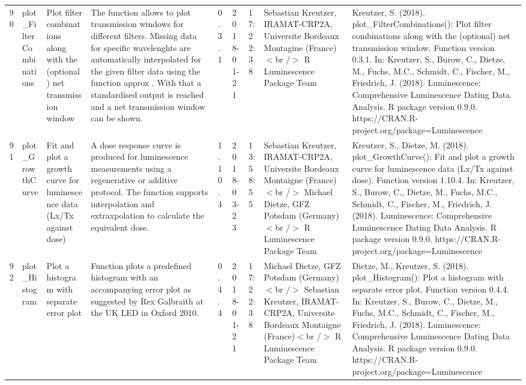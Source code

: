 \begin{table}[ht]
\begin{tabular}{rllllllll}
  90 & plot\_FilterCombinations & Plot filter combinations along with the (optional) net transmission window & The function allows to plot transmission windows for different filters. Missing data for specific wavelenghts are automatically interpolated for the given filter data using the function  approx . With that a standardised output is reached and a net transmission window can be shown. & 0.3.1 & 2018-01-21 & 17:22:38
 & Sebastian Kreutzer, IRAMAT-CRP2A, Universite Bordeaux Montagine (France)$<$br /$>$  R Luminescence Package Team & Kreutzer, S. (2018). plot\_FilterCombinations(): Plot filter combinations along with the (optional) net transmission window. Function version 0.3.1. In: Kreutzer, S., Burow, C., Dietze, M., Fuchs, M.C., Schmidt, C., Fischer, M., Friedrich, J. (2018). Luminescence: Comprehensive Luminescence Dating Data Analysis. R package version 0.9.0. https://CRAN.R-project.org/package=Luminescence
 \\ 
  91 & plot\_GrowthCurve & Fit and plot a growth curve for luminescence data (Lx/Tx against dose) & A dose response curve is produced for luminescence measurements using a regenerative or additive protocol. The function supports interpolation and extraxpolation to calculate the equivalent dose. & 1.10.4 & 2018-03-23 & 13:58:55
 & Sebastian Kreutzer, IRAMAT-CRP2A, Universite Bordeaux Montaigne (France) $<$br /$>$ Michael Dietze, GFZ Potsdam (Germany)$<$br /$>$  R Luminescence Package Team & Kreutzer, S., Dietze, M. (2018). plot\_GrowthCurve(): Fit and plot a growth curve for luminescence data (Lx/Tx against dose). Function version 1.10.4. In: Kreutzer, S., Burow, C., Dietze, M., Fuchs, M.C., Schmidt, C., Fischer, M., Friedrich, J. (2018). Luminescence: Comprehensive Luminescence Dating Data Analysis. R package version 0.9.0. https://CRAN.R-project.org/package=Luminescence
 \\ 
  92 & plot\_Histogram & Plot a histogram with separate error plot & Function plots a predefined histogram with an accompanying error plot as suggested by Rex Galbraith at the UK LED in Oxford 2010. & 0.4.4 & 2018-01-21 & 17:22:38
 & Michael Dietze, GFZ Potsdam (Germany) $<$br /$>$ Sebastian Kreutzer, IRAMAT-CRP2A, Universite Bordeaux Montaigne (France)$<$br /$>$  R Luminescence Package Team & Dietze, M., Kreutzer, S. (2018). plot\_Histogram(): Plot a histogram with separate error plot. Function version 0.4.4. In: Kreutzer, S., Burow, C., Dietze, M., Fuchs, M.C., Schmidt, C., Fischer, M., Friedrich, J. (2018). Luminescence: Comprehensive Luminescence Dating Data Analysis. R package version 0.9.0. https://CRAN.R-project.org/package=Luminescence

\end{tabular}
\end{table}
